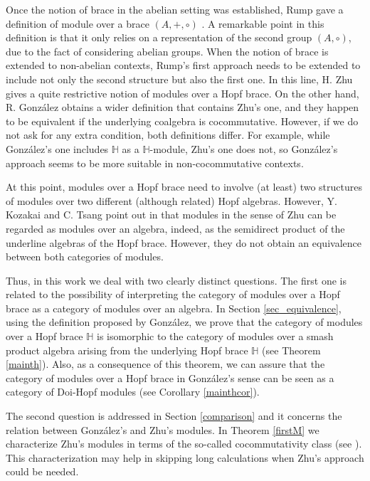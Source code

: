 \documentclass[11pt,reqno]{amsart}
\theoremstyle{plain}%
\theoremstyle{definition}
\theoremstyle{remark}
\begin{document}
Once the notion of brace in the abelian setting was established, Rump  gave a definition of module over a brace 
$(A, +, \circ)$ \cite[Definition 3]{Rump}. A remarkable point in this definition is that it only relies on a representation of the second group $(A, \circ)$, due to the fact of considering abelian groups. When the notion of brace is extended to non-abelian contexts, Rump's first approach needs to be extended to include not only the second structure but also the first one. In this line,  H. Zhu \cite{ZHU} gives a quite restrictive notion of modules over  a Hopf brace. On the other hand, R. González \cite{RGON} obtains a wider definition that contains Zhu's one, and they happen to be equivalent if the underlying coalgebra is cocommutative. However, if we do not ask for any extra condition, both definitions differ. For example, while González's one includes $\mathbb H$ as a $\mathbb H$-module, Zhu's one does not, so González's approach seems to be more suitable in non-cocommutative contexts.

At this point, modules over a Hopf  brace need to involve (at least) two structures of modules over two different (although related) Hopf algebras. However, Y. Kozakai and C. Tsang  point out in \cite[Remarks 2.2 and 3.2]{KOZTSANG} that modules in the sense of Zhu can be regarded as modules over an algebra, indeed, as the semidirect product of the underline algebras of the Hopf brace. However, they do not obtain an equivalence between both categories of modules. 

Thus, in this work we deal with two clearly distinct questions. The first one is related to the possibility of interpreting the category of modules over a Hopf brace as a category of modules over an algebra. In Section \ref{sec_equivalence}, using the definition proposed by González, we prove that the category of modules over a Hopf brace $\mathbb{H}$ is isomorphic to the category of modules over a smash product algebra arising from the underlying Hopf brace $\mathbb{H}$ (see Theorem \ref{mainth}).  Also, as a consequence of this theorem, we can assure that the category of modules over a Hopf brace  in González's sense can be seen as a category of Doi-Hopf modules (see Corollary \ref{mainthcor}). 

The second question is addressed in Section \ref{comparison}  and it concerns the relation between González's and Zhu's modules. In Theorem \ref{firstM} we characterize Zhu's modules in terms of the so-called cocommutativity class (see \cite{AVG}). This characterization may help in skipping long calculations when Zhu's approach could be needed. 
\end{document}

